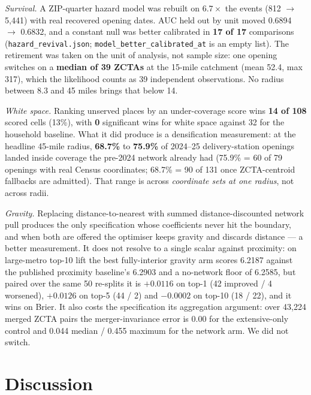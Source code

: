 \documentclass[conference]{IEEEtran}
\begin{document}
\emph{Survival.} A ZIP-quarter hazard model was rebuilt on $6.7\times$ the
events (812 $\rightarrow$ 5{,}441) with real recovered opening dates. AUC held
out by unit moved 0.6894 $\rightarrow$ 0.6832, and a constant null was better
calibrated in \textbf{17 of 17} comparisons
(\texttt{hazard\_revival.json}; \texttt{model\_better\_calibrated\_at} is an
empty list). The retirement was taken on the unit of analysis, not sample size:
one opening switches on a \textbf{median of 39 ZCTAs} at the 15-mile catchment
(mean 52.4, max 317), which the likelihood counts as 39 independent
observations. No radius between 8.3 and 45 miles brings that below 14.

\emph{White space.} Ranking unserved places by an under-coverage score wins
\textbf{14 of 108} scored cells (13\%), with \textbf{0} significant wins for
white space against 32 for the household baseline. What it did produce is a
densification measurement: at the headline 45-mile radius, \textbf{68.7\%} to
\textbf{75.9\%} of 2024--25 delivery-station openings landed inside coverage
the pre-2024 network already had (75.9\% = 60 of 79 openings with real Census
coordinates; 68.7\% = 90 of 131 once ZCTA-centroid fallbacks are admitted).
That range is across \emph{coordinate sets at one radius}, not across radii.

\emph{Gravity.} Replacing distance-to-nearest with summed distance-discounted
network pull produces the only specification whose coefficients never hit the
boundary, and when both are offered the optimiser keeps gravity and discards
distance --- a better measurement. It does not resolve to a single scalar
against proximity: on large-metro top-10 lift the best fully-interior gravity
arm scores 6.2187 against the published proximity baseline's 6.2903 and a
no-network floor of 6.2585, but paired over the same 50 re-splits it is
$+0.0116$ on top-1 (42 improved / 4 worsened), $+0.0126$ on top-5 (44 / 2) and
$-0.0002$ on top-10 (18 / 22), and it wins on Brier. It also costs the
specification its aggregation argument: over 43{,}224 merged ZCTA pairs the
merger-invariance error is 0.00 for the extensive-only control and 0.044
median / 0.455 maximum for the network arm. We did not switch.

\section{Discussion}
\end{document}
